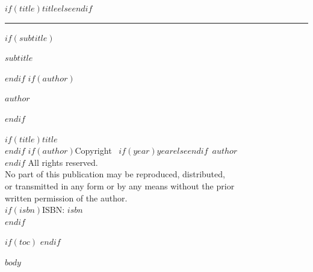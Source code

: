 \documentclass[%
  $if(fontsize)$$fontsize$$else$11pt$endif$,%
  $if(open-right)$openright$else$openany$endif$,%
  twoside%
]{book}
\begin{document}
\frontmatter
\pagestyle{empty}

\begin{titlepage}
  \centering
  {\Huge\bfseries\MakeUppercase{$if(title)$$title$$else$\relax$endif$}\par}
  \vspace{0.15in}
  \rule{0.35\textwidth}{0.4pt}\par
  $if(subtitle)$
  \vspace{0.2in}
  {\large\MakeUppercase{$subtitle$}\par}
  $endif$
  \vspace{0.8in}
  $if(author)$
  {\large\bfseries\MakeUppercase{$author$}\par}
  $endif$
\end{titlepage}

\clearpage
\thispagestyle{empty}
\vspace*{\fill}
\begin{center}
\small
$if(title)$\textit{$title$}\\[0.5em]$endif$
$if(author)$Copyright \textcopyright\ $if(year)$$year$$else$\the\year$endif$\ $author$\\[0.5em]$endif$
All rights reserved.\\[1em]
No part of this publication may be reproduced, distributed,\\
or transmitted in any form or by any means without the prior\\
written permission of the author.\\[1em]
$if(isbn)$ISBN: $isbn$\\[0.5em]$endif$
\end{center}
\vspace*{\fill}
\clearpage

$if(toc)$
\clearpage
\pagestyle{plain}
\tableofcontents
\clearpage
$endif$

\mainmatter
\pagestyle{fancy}

$body$

\backmatter
\end{document}
